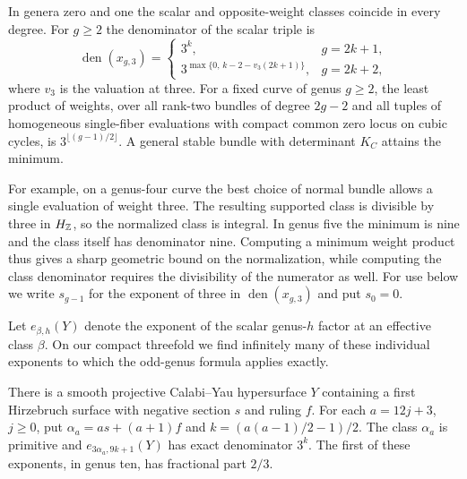 \begin{theorem}\label{thm:cubic}
In genera zero and one the scalar and opposite-weight classes coincide
in every degree. For $g\ge2$ the denominator of the scalar triple is
\[
 \operatorname{den}(x_{g,3})=
 \begin{cases}
  3^k, &g=2k+1,\\[2pt]
  3^{\max\{0,\,k-2-v_3(2k+1)\}}, &g=2k+2,
 \end{cases}
\]
where $v_3$ is the valuation at three. For a fixed curve of genus
$g\ge2$, the least product of weights, over all rank-two bundles of
degree $2g-2$ and all tuples of homogeneous single-fiber evaluations
with compact common zero locus on cubic cycles, is
$3^{\lfloor(g-1)/2\rfloor}$. A general stable bundle with determinant
$K_C$ attains the minimum.
\end{theorem}

For example, on a genus-four curve the best choice of normal bundle
allows a single evaluation of weight three. The resulting supported
class is divisible by three in $H_{\mathbb Z}$, so the normalized class is
integral. In genus five the minimum is nine and the class itself has
denominator nine. Computing a minimum weight product thus gives a
sharp geometric bound on the normalization, while computing the class
denominator requires the divisibility of the numerator as well.
For use below we write $s_{g-1}$ for the exponent of three in
$\operatorname{den}(x_{g,3})$ and put $s_0=0$.

Let $e_{\beta,h}(Y)$ denote the exponent of the scalar genus-$h$
factor at an effective class $\beta$. On our compact threefold we
find infinitely many of these individual exponents to which the
odd-genus formula applies exactly.

\begin{theorem}\label{thm:arith-compact}
There is a smooth projective Calabi--Yau hypersurface $Y$ containing
a first Hirzebruch surface with negative section $s$ and ruling $f$.
For each $a=12j+3$, $j\ge0$, put $\alpha_a=as+(a+1)f$ and
$k=(a(a-1)/2-1)/2$. The class $\alpha_a$ is primitive and
$e_{3\alpha_a,9k+1}(Y)$ has exact denominator $3^k$. The first of
these exponents, in genus ten, has fractional part $2/3$.
\end{theorem}

